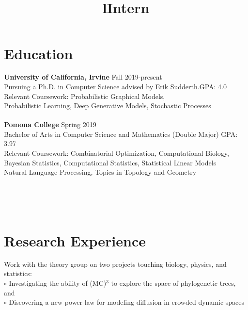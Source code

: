 \documentclass[margin]{res}
\begin{document}
\begin{resume}

\section{Education}
\textbf{University of California, Irvine} \hfill Fall 2019-present\\
Pursuing a Ph.D. in Computer Science advised by Erik Sudderth.\hfill GPA: 4.0\\
Relevant Coursework: Probabilistic Graphical Models,\\Probabilistic Learning, Deep Generative Models, Stochastic Processes\\ \\
\textbf{Pomona College} \hfill Spring 2019\\
Bachelor of Arts in Computer Science and Mathematics (Double Major) \hfill GPA: 3.97\\
Relevant Coursework: Combinatorial Optimization, Computational Biology,\\
Bayesian Statistics, Computational Statistics, Statistical Linear Models\\
Natural Language Processing, Topics in Topology and Geometry


\begin{format}
\title{l}\\
\\
\body\\
\end{format}
\section{Research Experience}

\title{\textbf{Intern}}
\begin{position}
Work with the theory group on two projects touching biology, physics, and statistics:\\
$\circ$ Investigating the ability of (MC)$^3$ to explore the space of phylogenetic trees, and \\
$\circ$ Discovering a new power law for modeling diffusion in crowded dynamic spaces
\end{position}


\end{resume}
\end{document}
